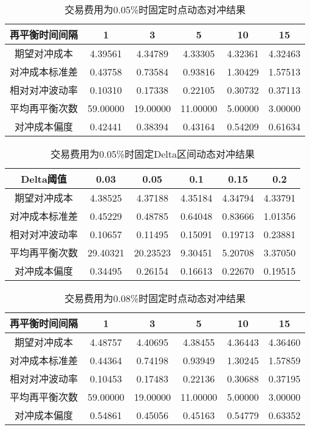 \begin{table}[htbp]
  \centering
  \caption{交易费用为0.05\%时固定时点动态对冲结果}
  \label{tab:fixed_time_0.05}
  \begin{tabular}{cccccc}
    \toprule
    再平衡时间间隔 & 1 & 3 & 5 & 10 & 15 \\
    \midrule
    期望对冲成本 & 4.39561 & 4.34789 & 4.33305 & 4.32361 & 4.32463 \\
    对冲成本标准差 & 0.43758 & 0.73584 & 0.93816 & 1.30429 & 1.57513 \\
    相对对冲波动率 & 0.10310 & 0.17338 & 0.22105 & 0.30732 & 0.37113 \\
    平均再平衡次数 & 59.00000 & 19.00000 & 11.00000 & 5.00000 & 3.00000 \\
    对冲成本偏度 & 0.42441 & 0.38394 & 0.43164 & 0.54209 & 0.61634 \\
    \bottomrule
  \end{tabular}
\end{table}

\begin{table}[htbp]
  \centering
  \caption{交易费用为0.05\%时固定Delta区间动态对冲结果}
  \label{tab:fixed_interval_0.05}
  \begin{tabular}{cccccc}
    \toprule
    Delta阈值 & 0.03 & 0.05 & 0.1 & 0.15 & 0.2 \\
    \midrule
    期望对冲成本 & 4.38525 & 4.37188 & 4.35184 & 4.34794 & 4.33791 \\
    对冲成本标准差 & 0.45229 & 0.48785 & 0.64048 & 0.83666 & 1.01356 \\
    相对对冲波动率 & 0.10657 & 0.11495 & 0.15091 & 0.19713 & 0.23881 \\
    平均再平衡次数 & 29.40321 & 20.23523 & 9.30451 & 5.20708 & 3.37050 \\
    对冲成本偏度 & 0.34495 & 0.26154 & 0.16613 & 0.22670 & 0.19515 \\
    \bottomrule
  \end{tabular}
\end{table}

\begin{table}[htbp]
  \centering
  \caption{交易费用为0.08\%时固定时点动态对冲结果}
  \label{tab:fixed_time_0.08}
  \begin{tabular}{cccccc}
    \toprule
    再平衡时间间隔 & 1 & 3 & 5 & 10 & 15 \\
    \midrule
    期望对冲成本 & 4.48757 & 4.40695 & 4.38455 & 4.36443 & 4.36460 \\
    对冲成本标准差 & 0.44364 & 0.74198 & 0.93949 & 1.30245 & 1.57859 \\
    相对对冲波动率 & 0.10453 & 0.17483 & 0.22136 & 0.30688 & 0.37195 \\
    平均再平衡次数 & 59.00000 & 19.00000 & 11.00000 & 5.00000 & 3.00000 \\
    对冲成本偏度 & 0.54861 & 0.45056 & 0.45163 & 0.54779 & 0.63352 \\
    \bottomrule
  \end{tabular}
\end{table}

